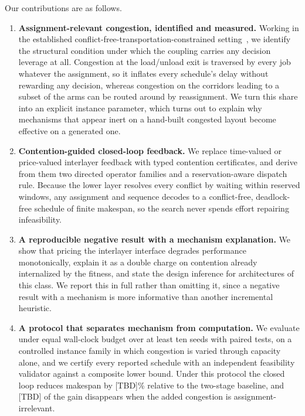 \documentclass[manuscript,screen,review]{acmart}
\begin{document}
Our contributions are as follows.

\begin{enumerate}[leftmargin=*]

\item \textbf{Assignment-relevant congestion, identified and measured.} Working in
the established conflict-free-\allowbreak transportation-constrained
setting~\cite{vanos2026exact}, we identify the structural condition under which
the coupling carries any decision leverage at all. Congestion at the load/unload
exit is traversed by every job whatever the assignment, so it inflates every
schedule's delay without rewarding any decision, whereas congestion on the
corridors leading to a subset of the arms can be routed around by reassignment.
We turn this share into an explicit instance parameter, which turns out to
explain why mechanisms that appear inert on a hand-built congested layout become
effective on a generated one.

\item \textbf{Contention-guided closed-loop feedback.} We replace time-valued or
price-valued interlayer feedback with typed contention certificates, and derive
from them two directed operator families and a reservation-aware dispatch rule.
Because the lower layer resolves every conflict by waiting within reserved
windows, any assignment and sequence decodes to a conflict-free, deadlock-free
schedule of finite makespan, so the search never spends effort repairing
infeasibility.

\item \textbf{A reproducible negative result with a mechanism explanation.} We
show that pricing the interlayer interface degrades performance monotonically,
explain it as a double charge on contention already internalized by the fitness,
and state the design inference for architectures of this class. We report this
in full rather than omitting it, since a negative result with a mechanism is
more informative than another incremental heuristic.

\item \textbf{A protocol that separates mechanism from computation.} We evaluate
under equal wall-clock budget over at least ten seeds with paired tests, on a
controlled instance family in which congestion is varied through capacity alone,
and we certify every reported schedule with an independent feasibility validator
against a composite lower bound. Under this protocol the closed loop reduces
makespan by [TBD]\% relative to the two-stage baseline, and [TBD] of the gain
disappears when the added congestion is assignment-irrelevant.
\end{enumerate}
\end{document}
